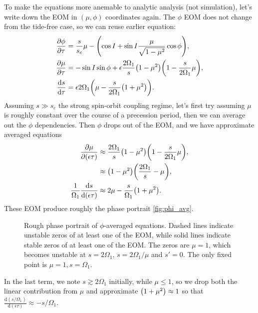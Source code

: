 \documentclass[11pt,
        usenames, %
        dvipsnames %
    ]{article}
\newcommand*{\rd}[2]{\frac{\mathrm{d}#1}{\mathrm{d}#2}}
\newcommand*{\pd}[2]{\frac{\partial#1}{\partial#2}}
\DeclarePairedDelimiter\p{\lparen}{\rparen}
\begin{document}
To make the equations more anemable to analytic analysis (not simulation), let's
write down the EOM in $(\mu, \phi)$ coordinates again. The $\phi$ EOM does not
change from the tide-free case, so we can reuse earlier equation:
\begin{align}
    \pd{\phi}{\tau} &= \frac{s}{s_c}\mu
        - \p*{\cos I + \sin I \frac{\mu}{\sqrt{1 - \mu^2}} \cos \phi} ,\\
    \pd{\mu}{\tau} &= -\sin I \sin \phi +
        \epsilon \frac{2\Omega_1}{s}\p*{1 - \mu^2}
            \p*{1 - \frac{s}{2\Omega_1}\mu},\\
    \rd{s}{\tau}
        &= \epsilon 2\Omega_1 \p*{\mu - \frac{s}{2\Omega_1}\p*{1 + \mu^2}}.
\end{align}
Assuming $s \gg s_c$ the strong spin-orbit coupling regime, let's first try
assuming $\mu$ is roughly constant over the course of a precession period, then
we can average out the $\phi$ dependencies. Then $\phi$ drops out of the EOM,
and we have approximate averaged equations
\begin{align}
    \pd{\mu}{(\epsilon\tau)} &\approx \frac{2\Omega_1}{s}\p*{1 - \mu^2}
            \p*{1 - \frac{s}{2\Omega_1}\mu},\nonumber\\
        &\approx \p*{1 - \mu^2}
            \p*{\frac{2\Omega_1}{s} - \mu},\\
    \frac{1}{\Omega_1}\rd{s}{(\epsilon\tau)}
        &\approx 2\mu - \frac{s}{\Omega_1}\p*{1 + \mu^2}.
\end{align}
These EOM produce roughly the phase portrait \autoref{fig:phi_avg}.
\begin{figure}[t]
    \centering
    \caption{Rough phase portrait of $\phi$-averaged equations. Dashed lines
    indicate unstable zeros of at least one of the EOM, while solid lines
    indicate stable zeros of at least one of the EOM\@. The zeros are $\mu = 1$,
    which becomes unstable at $s = 2\Omega_1$, $s = 2\Omega_1/\mu$ and $s' = 0$.
    The only fixed point is $\mu = 1, s = \Omega_1$.}\label{fig:phi_avg}
\end{figure}
In the last term, we note $s \gtrsim 2\Omega_1$ initially, while $\mu \leq 1$,
so we drop both the linear contribution from $\mu$ and approximate $\p*{1 +
\mu^2} \approx 1$ so that $\rd{(s/\Omega_1)}{(\epsilon\tau)} \approx
-s/\Omega_1$.
\end{document}

